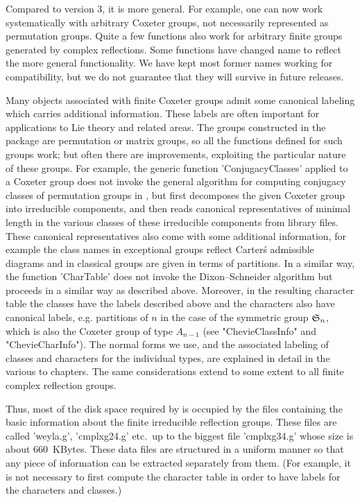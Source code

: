 Compared  to version 3, it  is more general. For  example, one can now work
systematically  with arbitrary Coxeter  groups, not necessarily represented
as permutation groups. Quite a few functions also work for arbitrary finite
groups  generated by complex reflections.  Some functions have changed name
to  reflect the more general functionality.  We have kept most former names
working  for compatibility, but we do  not guarantee that they will survive
in future releases.

Many  objects associated  with finite  Coxeter groups  admit some canonical
labeling  which  carries  additional  information.  These  labels are often
important  for applications  to Lie  theory and  related areas.  The groups
constructed  in the  package are  permutation or  matrix groups, so all the
functions  defined for such groups work;  but often there are improvements,
exploiting  the particular nature of these groups. For example, the generic
{\GAP}  function  'ConjugacyClasses'  applied  to  a Coxeter group does not
invoke the general algorithm for computing conjugacy classes of permutation
groups  in  \GAP,  but  first  decomposes  the  given  Coxeter  group  into
irreducible components, and then reads canonical representatives of minimal
length  in the various classes of these irreducible components from library
files.  These  canonical  representatives  also  come  with some additional
information,  for  example  the  class  names in exceptional groups reflect
Carter\'s admissible diagrams and in classical groups are given in terms of
partitions.  In a similar way, the function 'CharTable' does not invoke the
Dixon--Schneider  algorithm  but  proceeds  in  a  similar way as described
above.  Moreover, in  the resulting  character table  the classes  have the
labels  described above and the characters also have canonical labels, e.g.
partitions  of $n$ in  the case of  the symmetric group  ${\mathfrak S}_n$, which is
also  the  Coxeter  group  of  type  $A_{n-1}$  (see  "ChevieClassInfo" and
"ChevieCharInfo").  The normal forms we use, and the associated labeling of
classes and characters for the individual types, are explained in detail in
the  various to chapters. The same  considerations extend to some extent to
all finite complex reflection groups.

Thus, most of the disk space required by {\CHEVIE} is occupied by the files
containing  the basic  information about  the finite irreducible reflection
groups.  These files  are called  'weyla.g', 'cmplxg24.g'  etc.\ up  to the
biggest  file  'cmplxg34.g'  whose  size  is about $660$~KBytes. These data
files  are structured in a uniform manner  so that any piece of information
can be extracted separately from them. (For example, it is not necessary to
first  compute  the  character  table  in  order  to  have  labels  for the
characters and classes.)

